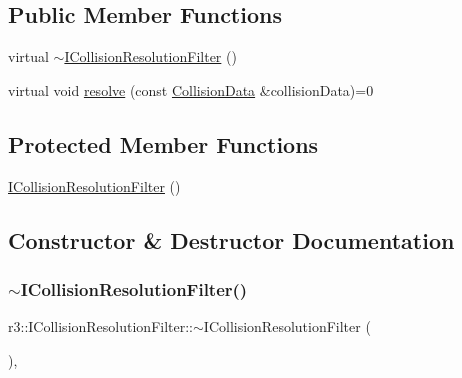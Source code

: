\subsection*{Public Member Functions}
\begin{DoxyCompactItemize}
\item 
virtual \mbox{\hyperlink{classr3_1_1_i_collision_resolution_filter_a89b3382d573308a790d436b9713b02ed}{$\sim$\+I\+Collision\+Resolution\+Filter}} ()
\item 
virtual void \mbox{\hyperlink{classr3_1_1_i_collision_resolution_filter_a9ae35c07c585500c409459ef87e5ae15}{resolve}} (const \mbox{\hyperlink{classr3_1_1_collision_data}{Collision\+Data}} \&collision\+Data)=0
\end{DoxyCompactItemize}
\subsection*{Protected Member Functions}
\begin{DoxyCompactItemize}
\item 
\mbox{\hyperlink{classr3_1_1_i_collision_resolution_filter_ab2dcf60620e28db288abf19bdeeb11ad}{I\+Collision\+Resolution\+Filter}} ()
\end{DoxyCompactItemize}


\subsection{Constructor \& Destructor Documentation}
\mbox{\label{classr3_1_1_i_collision_resolution_filter_a89b3382d573308a790d436b9713b02ed}} 
\subsubsection{\texorpdfstring{$\sim$\+I\+Collision\+Resolution\+Filter()}{~ICollisionResolutionFilter()}}
{\footnotesize\ttfamily r3\+::\+I\+Collision\+Resolution\+Filter\+::$\sim$\+I\+Collision\+Resolution\+Filter (\begin{DoxyParamCaption}{ }\end{DoxyParamCaption})\hspace{0.3cm}{\ttfamily [virtual]}, {\ttfamily [default]}}

